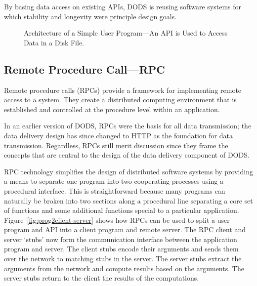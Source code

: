 By basing data access on existing APIs, DODS is reusing software
systems for which stability and longevity were principle design goals.

\begin{figure}
\centerline{}
\caption{Architecture of a Simple User Program---An API is Used to Access
  Data in a Disk File.}
\label{fig:stand-alone}
\end{figure}

\subsection{Remote Procedure Call---RPC} 
\label{dda-rpc}

Remote procedure calls (RPCs) provide a framework for implementing remote
access to a system.  They create a distributed computing environment that is
established and controlled at the procedure level within an application. 

In an earlier version of DODS, RPCs were the basis for all data transmission;
the data delivery design has since changed to HTTP as the foundation for data
transmission. Regardless, RPCs still merit discussion since they frame the
concepts that are central to the design of the data delivery component of
DODS\@.

RPC technology simplifies the design of distributed software systems by
providing a means to separate one program into two cooperating processes
using a procedural interface. This is straightforward because many programs
can naturally be broken into two sections along a procedural line separating
a core set of functions and some additional functions special to a particular
application. Figure~\ref{fig:prog2client-server} shows how RPCs can be used
to split a user program and API into a client program and remote server.  The
RPC client and server `stubs' now form the communication interface between
the application program and server. The client stubs encode their arguments
and sends them over the network to matching stubs in the server. The server
stubs extract the arguments from the network and compute results based on the
arguments. The server stubs return to the client the results of the
computations.

